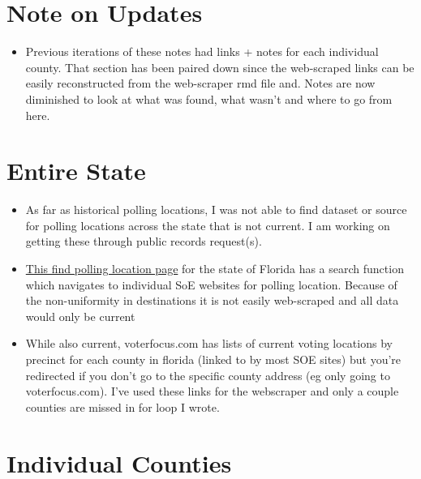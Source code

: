 \documentclass[12pt]{article}
\title{\tb{Polling Location Notes}}
\author{Annika}
\affil{New College of Florida}
\date{June 6, 2020}
\begin{document}
\maketitle
\clearpage

\tableofcontents
\clearpage

\section{Note on Updates}
\begin{itemize}
  \item Previous iterations of these notes had links + notes for each individual county. That section has been paired down since the web-scraped links can be easily reconstructed from the web-scraper rmd file and. Notes are now diminished to look at what was found, what wasn't and where to go from here.
\end{itemize}


\section{Entire State}
\begin{itemize}
  \item As far as historical polling locations, I was not able to find dataset or source for polling locations across the state that is not current. I am working on getting these through public records request(s).
  \item \href{https://registration.elections.myflorida.com/CheckVoterStatus}{This find polling location page} for the state of Florida has a search function which navigates to individual SoE websites for polling location. Because of the non-uniformity in destinations it is not easily web-scraped and all data would only be current
  \item While also current, voterfocus.com has lists of current voting locations by precinct for each county in florida (linked to by most SOE sites) but you're redirected if you don't go to the specific county address (eg only going to voterfocus.com). I've used these links for the webscraper and only a couple counties are missed in for loop I wrote.
\end{itemize}

\clearpage

\section{Individual Counties}
\end{document}
